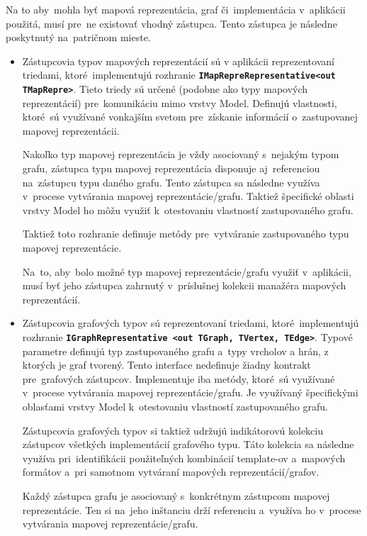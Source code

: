Na to aby~mohla byť mapová reprezentácia, graf či~implementácia v~aplikácii použitá, musí pre~ne existovať vhodný zástupca. Tento zástupca je následne poskytnutý na~patričnom mieste.
\begin{itemize}
    \item Zástupcovia typov mapových reprezentácií sú v aplikácii reprezentovaní triedami, ktoré~implementujú rozhranie \textbf{\texttt{IMapRepreRepresentative<out TMapRepre>}}. Tieto triedy sú určené (podobne ako typy mapových reprezentácií) pre~komunikáciu mimo vrstvy Model. Definujú vlastnosti, ktoré~sú využívané vonkajším svetom pre~získanie informácií o~zastupovanej mapovej reprezentácii. 
    
    Nakoľko typ mapovej reprezentácia je vždy asociovaný s~nejakým typom grafu, zástupca typu mapovej reprezentácia disponuje aj~referenciou na~zástupcu typu daného grafu. Tento zástupca sa následne využíva v~procese vytvárania mapovej reprezentácie/grafu. Taktiež špecifické oblasti vrstvy Model ho môžu využiť k~otestovaniu vlastností zastupovaného grafu.

    Taktiež toto rozhranie definuje metódy pre~vytváranie zastupovaného typu mapovej reprezentácie. 

    Na~to, aby~bolo možné typ mapovej reprezentácie/grafu využiť v~aplikácii, musí byť jeho zástupca zahrnutý v~príslušnej kolekcii manažéra mapových reprezentácií.

    \item Zástupcovia grafových typov sú reprezentovaní triedami, ktoré~implementujú rozhranie \textbf{\texttt{IGraphRepresentative <out TGraph, TVertex, TEdge>}}. Typové parametre definujú typ zastupovaného grafu a~typy vrcholov a hrán, z ktorých je graf tvorený. Tento interface nedefinuje žiadny kontrakt pre~grafových zástupcov. Implementuje iba metódy, ktoré~sú využívané v~procese vytvárania mapovej reprezentácie/grafu. Je využívaný špecifickými oblasťami vrstvy Model k~otestovaniu vlastností zastupovaného grafu.

    Zástupcovia grafových typov si taktiež udržujú indikátorovú kolekciu zástupcov všetkých implementácií grafového typu. Táto kolekcia sa následne využíva pri~identifikácii použiteľných kombinácií template-ov a~mapových formátov a~pri samotnom vytváraní mapových reprezentácií/grafov.

    Každý zástupca grafu je asociovaný s~konkrétnym zástupcom mapovej reprezentácie. Ten si na~jeho inštanciu drží referenciu a~využíva ho v~procese vytvárania mapovej reprezentácie/grafu.


\end{itemize}
